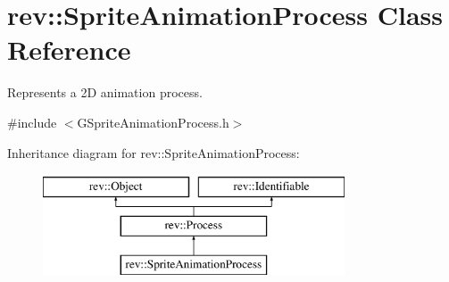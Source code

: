 \hypertarget{classrev_1_1_sprite_animation_process}{}\section{rev\+::Sprite\+Animation\+Process Class Reference}
\label{classrev_1_1_sprite_animation_process}


Represents a 2D animation process.  




{\ttfamily \#include $<$G\+Sprite\+Animation\+Process.\+h$>$}

Inheritance diagram for rev\+::Sprite\+Animation\+Process\+:\begin{figure}[H]
\begin{center}
\leavevmode
\includegraphics[height=3.000000cm]{classrev_1_1_sprite_animation_process}
\end{center}
\end{figure}
